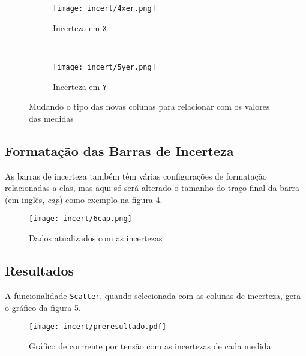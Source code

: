     \begin{figure}[htbp]
        \centering
        \begin{subfigure}{0.45\textwidth}
            \centering
            \texttt{[image: incert/4xer.png]}

            \caption{Incerteza em \texttt{X}}
            \label{fig:incert:xer}
        \end{subfigure}
        ~
        \begin{subfigure}{0.45\textwidth}
            \centering
            \texttt{[image: incert/5yer.png]}

            \caption{Incerteza em \texttt{Y}}
            \label{fig:incert:yer}
        \end{subfigure}
        \caption{Mudando o tipo das novas colunas para relacionar com os valores das medidas}
        \label{fig:incert:tipos}
    \end{figure}


\subsection{Formatação das Barras de Incerteza}

    As barras de incerteza também têm várias configurações de formatação relacionadas a elas, mas aqui só será alterado o tamanho do traço final da barra (em inglês, \textit{cap}) como exemplo na figura \ref{fig:incert:capsz}.

    \begin{figure}[htbp]
        \centering
        \texttt{[image: incert/6cap.png]}

        \caption{Dados atualizados com as incertezas}
        \label{fig:incert:capsz}
    \end{figure}


\subsection{Resultados}

    A funcionalidade \texttt{Scatter}, quando selecionada com as colunas de incerteza, gera o gráfico da figura \ref{fig:incert:preresultado}.

    \begin{figure}[htbp]
        \centering
        \texttt{[image: incert/preresultado.pdf]}

        \caption{Gráfico de corrrente por tensão com as incertezas de cada medida}
        \label{fig:incert:preresultado}
    \end{figure}

